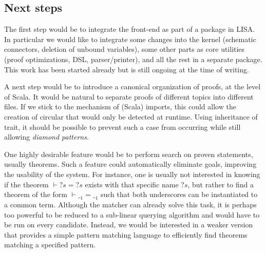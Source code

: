\subsection{Next steps}

The first step would be to integrate the front-end as part of a package in LISA. In particular we would like to integrate some changes into the kernel (schematic connectors, deletion of unbound variables), some other parts as core utilities (proof optimizations, DSL, parser/printer), and all the rest in a separate package. This work has been started already but is still ongoing at the time of writing.

A next step would be to introduce a canonical organization of proofs, at the level of Scala. It would be natural to separate proofs of different topics into different files. If we stick to the mechanism of (Scala) imports, this could allow the creation of circular that would only be detected at runtime. Using inheritance of trait, it should be possible to prevent such a case from occurring while still allowing \textit{diamond patterns}.

One highly desirable feature would be to perform search on proven statements, usually theorems. Such a feature could automatically eliminate goals, improving the usability of the system. For instance, one is usually not interested in knowing if the theorem $\vdash {?s} = {?s}$ exists with that specific name ${?s}$, but rather to find a theorem of the form $\vdash \__1 = \__1$ such that both underscores can be instantiated to a common term. Although the matcher can already solve this task, it is perhaps too powerful to be reduced to a sub-linear querying algorithm and would have to be run on every candidate. Instead, we would be interested in a weaker version that provides a simple pattern matching language to efficiently find theorems matching a specified pattern.
